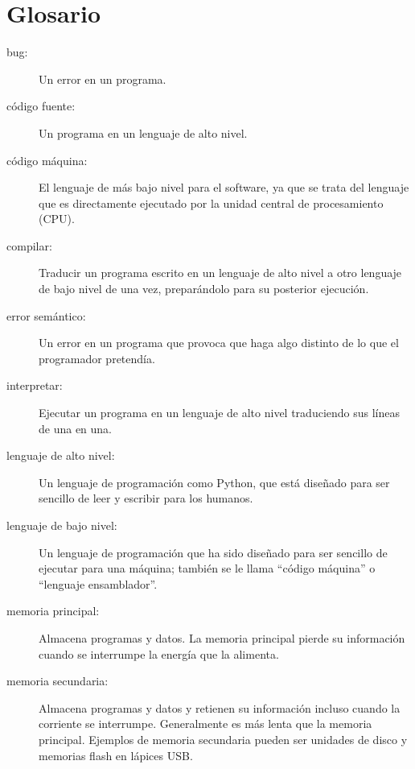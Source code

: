 \section{Glosario}

\begin{description}

\item[bug:] Un error en un programa.

\item[código fuente:] Un programa en un lenguaje de alto nivel.

\item[código máquina:] El lenguaje de más bajo nivel para el software, ya que se trata
del lenguaje que es directamente ejecutado por la unidad central de procesamiento
(CPU).

\item[compilar:] Traducir un programa escrito en un lenguaje de alto nivel
a otro lenguaje de bajo nivel de una vez, preparándolo para su posterior
ejecución.

\item[error semántico:] Un error en un programa que provoca que haga algo
distinto de lo que el programador pretendía.

\item[interpretar:]  Ejecutar un programa en un lenguaje de alto nivel
traduciendo sus líneas de una en una.

\item[lenguaje de alto nivel:]  Un lenguaje de programación como Python, que
está diseñado para ser sencillo de leer y escribir para los humanos.

\item[lenguaje de bajo nivel:]  Un lenguaje de programación que ha sido diseñado
para ser sencillo de ejecutar para una máquina; también se le llama ``código máquina''
o ``lenguaje ensamblador''.

\item[memoria principal:] Almacena programas y datos. La memoria principal pierde
su información cuando se interrumpe la energía que la alimenta.

\item[memoria secundaria:] Almacena programas y datos y retienen su
información incluso cuando la corriente se interrumpe. Generalmente es más lenta
que la memoria principal. Ejemplos de memoria secundaria pueden ser unidades de
disco y memorias flash en lápices USB.


\end{description}
